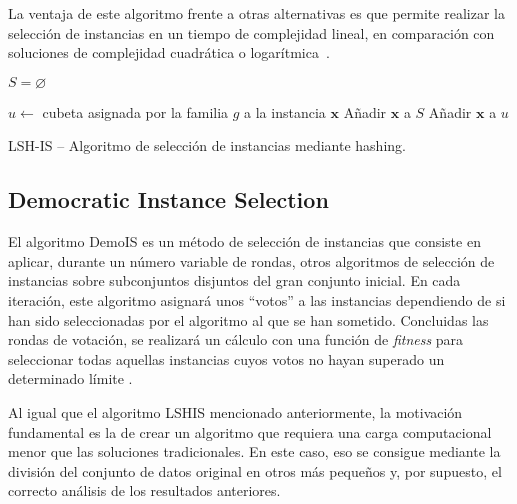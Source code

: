 La ventaja de este algoritmo frente a otras alternativas es que permite realizar la selección de instancias en un tiempo de complejidad lineal, en comparación con soluciones de complejidad cuadrática o logarítmica~\cite{LSHISPaper}.


\begin{algorithm*}
\DontPrintSemicolon
{}

$ S = \varnothing $

 {
   {
     $u\leftarrow$ cubeta asignada por la familia $g$ a la instancia $\mathbf{x}$ \;
     {
       Añadir $ \mathbf{x} $ a $ S $ \;
       Añadir $ \mathbf{x} $ a $ u $ \;
     }
  }
}

\caption{LSH-IS -- Algoritmo de selección de instancias mediante hashing. \cite{LSHISPaper}}
\label{alg:LSHIS}
\end{algorithm*}

\subsection{Democratic Instance Selection}\label{sec:defDemoIS}

El algoritmo DemoIS es un método de selección de instancias que consiste en aplicar, durante un número variable de rondas, otros algoritmos de selección de instancias sobre subconjuntos disjuntos del gran conjunto inicial. En cada iteración, este algoritmo asignará unos ``votos'' a las instancias dependiendo de si han sido seleccionadas por el algoritmo al que se han sometido. Concluidas las rondas de votación, se realizará un cálculo con una función de \textit{fitness} para seleccionar todas aquellas instancias cuyos votos no hayan superado un determinado límite \cite{DemoISPaper}.
 
Al igual que el algoritmo LSHIS mencionado anteriormente, la motivación fundamental es la de crear un algoritmo que requiera una carga computacional menor que las soluciones tradicionales. En este caso, eso se consigue mediante la división del conjunto de datos original en otros más pequeños y, por supuesto, el correcto análisis de los resultados anteriores.


